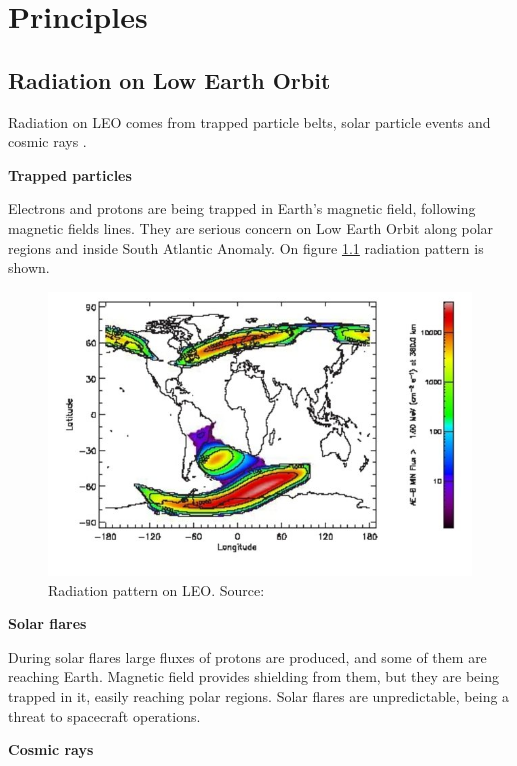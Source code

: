 \chapter{Principles}

\section{Radiation on Low Earth Orbit}
    Radiation on LEO comes from trapped particle belts, solar particle events and cosmic rays \cite{ESA_radiation}.
    
    \bigskip \textbf{Trapped particles}
    
    Electrons and protons are being trapped in Earth's magnetic field, following magnetic fields lines. They are serious concern on Low Earth Orbit along polar regions and inside South Atlantic Anomaly. On figure \ref{Polar_SAA} radiation pattern is shown.
    
    \begin{figure}[H]
        \centering
        \includegraphics[width=0.6\paperwidth]{img/03/polar_SAA.png}
        \caption{Radiation pattern on LEO. Source: \cite{ESA_radiation}}
        \label{Polar_SAA}
    \end{figure}

    \bigskip \textbf{Solar flares}
    
    During solar flares large fluxes of protons are produced, and some of them are reaching Earth. Magnetic field provides shielding from them, but they are being trapped in it, easily reaching polar regions. Solar flares are unpredictable, being a threat to spacecraft operations.
    
    \bigskip \textbf{Cosmic rays}

